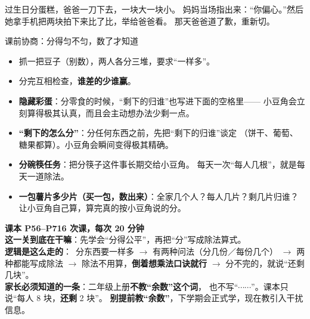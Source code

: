 
\begin{blunder}
过生日分蛋糕，爸爸一刀下去，一块大一块小。
妈妈当场指出来：“你偏心。”然后她拿手机把两块拍下来比了比，举给爸爸看。
那天爸爸道了歉，重新切。
\end{blunder}

\begin{gamble}{课前协商：分得匀不匀，数了才知道}
\begin{itemize}
  \item 抓一把豆子（别数），两人各分三堆，要求“一样多”。
  \item 分完互相检查，\textbf{谁差的少谁赢}。
  \item \textbf{隐藏彩蛋}：分零食的时候，“剩下的归谁”也写进下面的空格里——
        小豆角会立刻算得极其认真，而且会主动想办法少剩一点。
\end{itemize}
\negolines
\end{gamble}

\begin{bonus}
\begin{itemize}
  \item \textbf{“剩下的怎么分”}：分任何东西之前，先把“剩下的归谁”谈定
        （饼干、葡萄、糖果都算）。小豆角会瞬间变得极其精确。
  \item \textbf{分碗筷任务}：把分筷子这件事长期交给小豆角。
        每天一次“每人几根”，就是每天一道除法。
  \item \textbf{一包薯片多少片（买一包，数出来）}：全家几个人？每人几片？剩几片归谁？
        让小豆角自己算，算完真的按小豆角说的分。
\end{itemize}
\end{bonus}

\begin{unitinfo}
\textbf{课本 P56--P71}\quad \textbf{6 次课，每次 20 分钟} \\[4pt]
\textbf{这一关到底在干嘛}：先学会“分得公平”，再把“分”写成除法算式。\\
\textbf{逻辑是这么走的}：\ 分东西要一样多 $\to$ 有两种问法（分几份／每份几个）
$\to$ 两种都能写成除法 $\to$ 除法不用算，\textbf{倒着想乘法口诀就行}
$\to$ 分不完的，就说“还剩几块”。\\
\textbf{家长必须知道的一条}：二年级上册\textbf{不教“余数”这个词}，
也不写“$\cdots\cdots$”。课本只说“每人 8 块，\textbf{还剩} 2 块”。
\textbf{别提前教“余数”}，下学期会正式学，现在教引入干扰信息。
\end{unitinfo}

